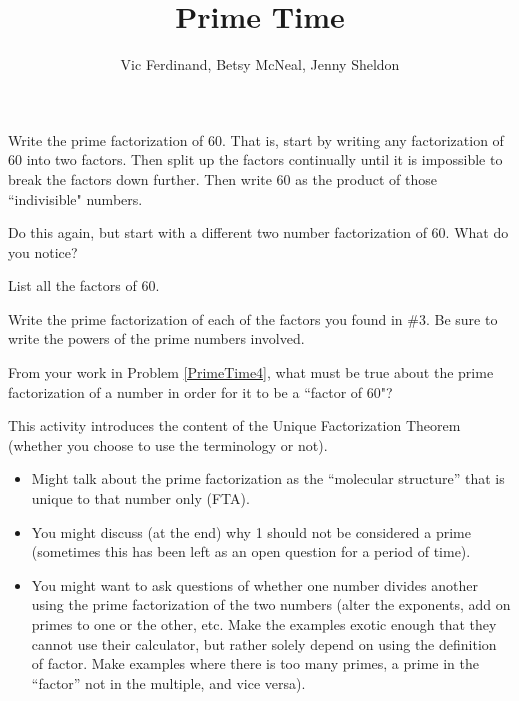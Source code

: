 \documentclass{ximera}
\title{Prime Time}
\author{Vic Ferdinand, Betsy McNeal, Jenny Sheldon}
\begin{document}
\begin{abstract} \end{abstract}
\maketitle



\begin{problem}
 Write the prime factorization of 60.  That is, start by writing any factorization of 60 into two factors.  Then split up the factors continually until it is impossible to break the factors down further.  Then write 60 as the product of those ``indivisible" numbers.
\end{problem} 
\begin{problem}
 Do this again, but start with a different two number factorization of 60.  What do you notice?
\end{problem} 
\begin{problem}
 List all the factors of 60.
\end{problem} 
\begin{problem}\label{PrimeTime4}
 Write the prime factorization of each of the factors you found in $\#$3.  Be sure to write the powers of the prime numbers involved.
\end{problem} 
\begin{problem}
 From your work in Problem \ref{PrimeTime4}, what must be true about the prime factorization of a number in order for it to be a ``factor of 60"? 
\end{problem} 


\newpage
\begin{instructorNotes}
This activity introduces the content of the Unique Factorization Theorem (whether you choose to use the terminology or not). 

\begin{itemize}
	\item Might talk about the prime factorization as the ``molecular structure'' that is unique to that number only (FTA).
	\item You might discuss (at the end)  why 1 should not be considered a prime (sometimes this has been left as an open question for a period of time).
	\item You might want to ask questions of whether one number divides another using the prime factorization of the two numbers (alter the exponents, add on primes to one or the other, etc.  Make the examples exotic enough that they cannot use their calculator, but rather solely depend on using the definition of factor.   Make examples where there is too many primes, a prime in the ``factor'' not in the multiple, and vice versa). 
\end{itemize}
\end{instructorNotes}
\end{document}
